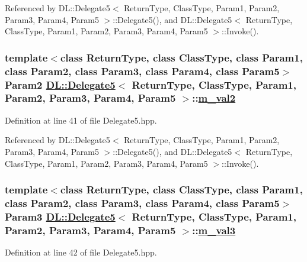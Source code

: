 Referenced by DL::Delegate5$<$ Return\-Type, Class\-Type, Param1, Param2, Param3, Param4, Param5 $>$::Delegate5(), and DL::Delegate5$<$ Return\-Type, Class\-Type, Param1, Param2, Param3, Param4, Param5 $>$::Invoke().\hypertarget{classDL_1_1Delegate5_r3}{
\subsubsection[m\_\-val2]{\setlength{\rightskip}{0pt plus 5cm}template$<$class Return\-Type, class Class\-Type, class Param1, class Param2, class Param3, class Param4, class Param5$>$ Param2 \hyperlink{classDL_1_1Delegate5}{DL::Delegate5}$<$ Return\-Type, Class\-Type, Param1, Param2, Param3, Param4, Param5 $>$::\hyperlink{classDL_1_1Delegate5_r3}{m\_\-val2}}}
\label{classDL_1_1Delegate5_r3}




Definition at line 41 of file Delegate5.hpp.

Referenced by DL::Delegate5$<$ Return\-Type, Class\-Type, Param1, Param2, Param3, Param4, Param5 $>$::Delegate5(), and DL::Delegate5$<$ Return\-Type, Class\-Type, Param1, Param2, Param3, Param4, Param5 $>$::Invoke().\hypertarget{classDL_1_1Delegate5_r4}{
\subsubsection[m\_\-val3]{\setlength{\rightskip}{0pt plus 5cm}template$<$class Return\-Type, class Class\-Type, class Param1, class Param2, class Param3, class Param4, class Param5$>$ Param3 \hyperlink{classDL_1_1Delegate5}{DL::Delegate5}$<$ Return\-Type, Class\-Type, Param1, Param2, Param3, Param4, Param5 $>$::\hyperlink{classDL_1_1Delegate5_r4}{m\_\-val3}}}
\label{classDL_1_1Delegate5_r4}




Definition at line 42 of file Delegate5.hpp.

